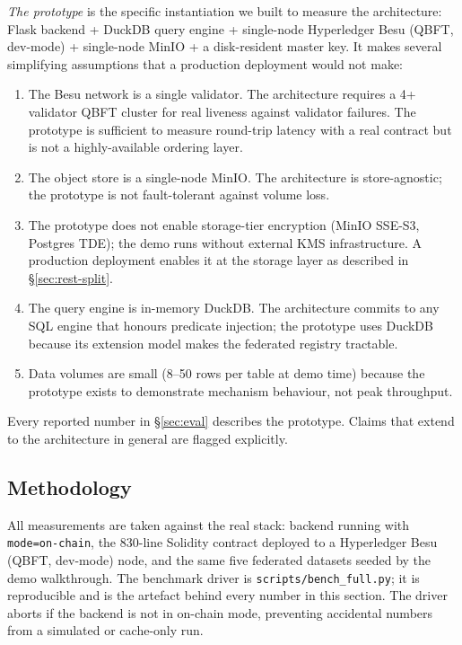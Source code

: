 \documentclass[10pt,twocolumn]{article}
\begin{document}
\emph{The prototype} is the specific instantiation we built to
measure the architecture: Flask backend + DuckDB query engine +
single-node Hyperledger Besu (QBFT, dev-mode) + single-node MinIO
+ a disk-resident master key. It makes several simplifying
assumptions that a production deployment would not make:

\begin{enumerate}[leftmargin=*,topsep=3pt,itemsep=2pt]
\item The Besu network is a single validator. The architecture
  requires a 4+ validator QBFT cluster for real liveness against
  validator failures. The prototype is sufficient to measure
  round-trip latency with a real contract but is not a
  highly-available ordering layer.
\item The object store is a single-node MinIO. The architecture
  is store-agnostic; the prototype is not fault-tolerant against
  volume loss.
\item The prototype does not enable storage-tier encryption
  (MinIO SSE-S3, Postgres TDE); the demo runs without external
  KMS infrastructure. A production deployment enables it at the
  storage layer as described in \S\ref{sec:rest-split}.
\item The query engine is in-memory DuckDB. The architecture
  commits to any SQL engine that honours predicate injection; the
  prototype uses DuckDB because its extension model makes the
  federated registry tractable.
\item Data volumes are small (8--50 rows per table at demo time)
  because the prototype exists to demonstrate mechanism behaviour,
  not peak throughput.
\end{enumerate}

Every reported number in \S\ref{sec:eval} describes the prototype.
Claims that extend to the architecture in general are flagged
explicitly.


\subsection{Methodology}

All measurements are taken against the real stack: backend running
with \texttt{mode=on-chain}, the 830-line Solidity contract
deployed to a Hyperledger Besu (QBFT, dev-mode) node, and the same
five federated datasets seeded by the demo walkthrough. The
benchmark driver is \texttt{scripts/bench\_full.py}; it is
reproducible and is the artefact behind every number in this
section. The driver aborts if the backend is not in on-chain mode,
preventing accidental numbers from a simulated or cache-only run.
\end{document}
